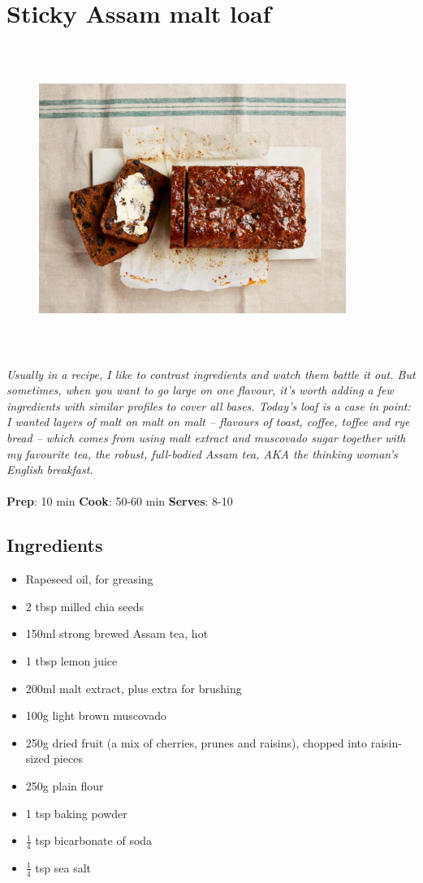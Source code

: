 \documentclass{book}
\begin{document}
\section{Sticky Assam malt loaf}
\begin{figure}
\centering\includegraphics[width=10cm,height=10cm,keepaspectratio]{Recipe_Pictures/Sticky_Assam_malt_loaf.png}
\end{figure}
\emph{Usually in a recipe, I like to contrast ingredients and watch them battle it out. But sometimes, when you want to go large on one flavour, it’s worth adding a few ingredients with similar profiles to cover all bases. Today’s loaf is a case in point: I wanted layers of malt on malt on malt – flavours of toast, coffee, toffee and rye bread – which comes from using malt extract and muscovado sugar together with my favourite tea, the robust, full-bodied Assam tea, AKA the thinking woman’s English breakfast.}\\\\ 
\textbf{Prep}: 10 min
\textbf{Cook}: 50-60 min
\textbf{Serves}: 8-10
\subsection*{Ingredients}
\begin{itemize}
\item Rapeseed oil, for greasing
\item 2 tbsp milled chia seeds
\item 150ml strong brewed Assam tea, hot
\item 1 tbsp lemon juice
\item 200ml malt extract, plus extra for brushing
\item 100g light brown muscovado
\item 250g dried fruit (a mix of cherries, prunes and raisins), chopped into raisin-sized pieces
\item 250g plain flour
\item 1 tsp baking powder
\item $\frac{1}{4}$ tsp bicarbonate of soda
\item $\frac{1}{4}$ tsp sea salt
\end{itemize}
\end{document}
